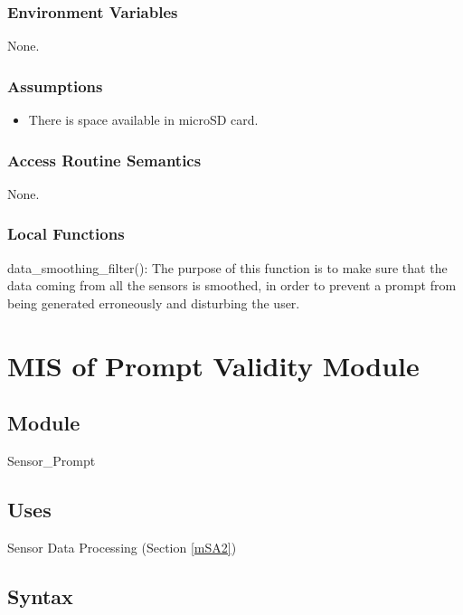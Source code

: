 \documentclass[12pt, titlepage]{article}
\begin{document}
\subsubsection{Environment Variables}
None.

\subsubsection{Assumptions}

\begin{itemize}
\item There is space available in microSD card.
\end{itemize}

\subsubsection{Access Routine Semantics}
None.

\subsubsection{Local Functions}

data\_smoothing\_filter(): The purpose of this function is to make sure that the data coming from all the sensors is smoothed, in order to prevent a prompt from being generated erroneously and disturbing the user.

\newpage

\section{MIS of Prompt Validity Module} \label{mSA3} 

\subsection{Module}

Sensor\_Prompt

\subsection{Uses}

Sensor Data Processing (Section \ref{mSA2})

\subsection{Syntax}
\end{document}
